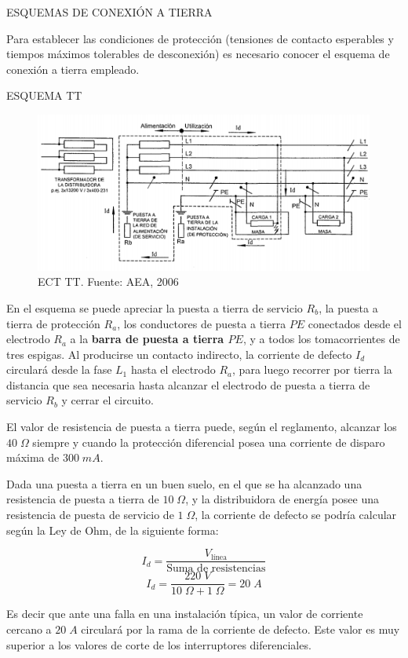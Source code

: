 
ESQUEMAS DE CONEXIÓN A TIERRA

Para establecer las condiciones de protección (tensiones de contacto esperables y tiempos máximos tolerables de desconexión) es necesario conocer el esquema de conexión a tierra empleado.
 
ESQUEMA TT

\begin{figure}[htbp]
  \centering  
  \includegraphics[width=\textwidth]{images/ect-tt}
  \caption{ECT TT. Fuente: AEA, 2006}
  \label{fig:ect-tt}
\end{figure}

En el esquema se puede apreciar la puesta a tierra de servicio $R_b$, la puesta a tierra de protección $R_a$, los conductores de puesta a tierra $PE$ conectados desde el electrodo $R_a$ a la \textbf{barra de puesta a tierra $PE$}, y a todos los tomacorrientes de tres espigas.
Al producirse un contacto indirecto, la corriente de defecto $I_d$ circulará desde la fase $L_1$ hasta el electrodo $R_a$, para luego recorrer por tierra la distancia que sea necesaria hasta alcanzar el electrodo de puesta a tierra de servicio $R_b$ y cerrar el circuito.

El valor de resistencia de puesta a tierra puede, según el reglamento, alcanzar los $40\; \Omega$ siempre y cuando la protección diferencial posea una corriente de disparo máxima de $300\; mA$.

\begin{ejemplo}
	Dada una puesta a tierra en un buen suelo, en el que se ha alcanzado una resistencia de puesta a tierra de $10\; \Omega$, y la distribuidora de energía posee una resistencia de puesta de servicio de $1\; \Omega$, la corriente de defecto se podría calcular según la Ley de Ohm, de la siguiente forma:
	
	$$I_d= \frac{V_{\text{línea}}}{\text{Suma de resistencias}}$$
	$$I_d = \frac{220\; V}{10\; \Omega + 1\; \Omega}=20\; A $$

	Es decir que ante una falla en una instalación típica, un valor de corriente cercano a $20\; A$ circulará por la rama de la corriente de defecto. Este valor es muy superior a los valores de corte de los interruptores diferenciales.
\end{ejemplo}

